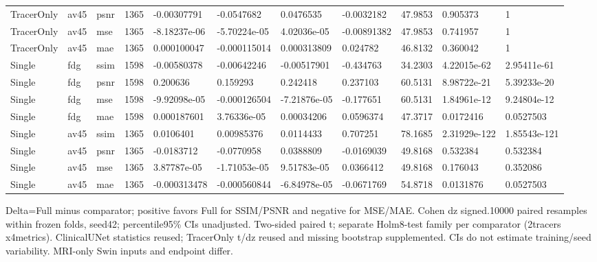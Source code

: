 \documentclass{article}
\begin{document}
\begin{landscape}
\begin{longtable}{lllllllllll}
TracerOnly & av45 & psnr & 1365 & -0.00307791 & -0.0547682 & 0.0476535 & -0.0032182 & 47.9853 & 0.905373 & 1 \\
TracerOnly & av45 & mse & 1365 & -8.18237e-06 & -5.70224e-05 & 4.02036e-05 & -0.00891382 & 47.9853 & 0.741957 & 1 \\
TracerOnly & av45 & mae & 1365 & 0.000100047 & -0.000115014 & 0.000313809 & 0.024782 & 46.8132 & 0.360042 & 1 \\
Single & fdg & ssim & 1598 & -0.00580378 & -0.00642246 & -0.00517901 & -0.434763 & 34.2303 & 4.22015e-62 & 2.95411e-61 \\
Single & fdg & psnr & 1598 & 0.200636 & 0.159293 & 0.242418 & 0.237103 & 60.5131 & 8.98722e-21 & 5.39233e-20 \\
Single & fdg & mse & 1598 & -9.92098e-05 & -0.000126504 & -7.21876e-05 & -0.177651 & 60.5131 & 1.84961e-12 & 9.24804e-12 \\
Single & fdg & mae & 1598 & 0.000187601 & 3.76336e-05 & 0.00034206 & 0.0596374 & 47.3717 & 0.0172416 & 0.0527503 \\
Single & av45 & ssim & 1365 & 0.0106401 & 0.00985376 & 0.0114433 & 0.707251 & 78.1685 & 2.31929e-122 & 1.85543e-121 \\
Single & av45 & psnr & 1365 & -0.0183712 & -0.0770958 & 0.0388809 & -0.0169039 & 49.8168 & 0.532384 & 0.532384 \\
Single & av45 & mse & 1365 & 3.87787e-05 & -1.71053e-05 & 9.51783e-05 & 0.0366412 & 49.8168 & 0.176043 & 0.352086 \\
Single & av45 & mae & 1365 & -0.000313478 & -0.000560844 & -6.84978e-05 & -0.0671769 & 54.8718 & 0.0131876 & 0.0527503 \\
\end{longtable}
\noindent\parbox{\linewidth}{\footnotesize Delta=Full minus comparator; positive favors Full for SSIM/PSNR and negative for MSE/MAE. Cohen dz signed.10000 paired resamples within frozen folds, seed42; percentile95\% CIs unadjusted. Two-sided paired t; separate Holm8-test family per comparator (2tracers x4metrics). ClinicalUNet statistics reused; TracerOnly t/dz reused and missing bootstrap supplemented. CIs do not estimate training/seed variability. MRI-only Swin inputs and endpoint differ.}
\endgroup
\end{landscape}

\end{document}
